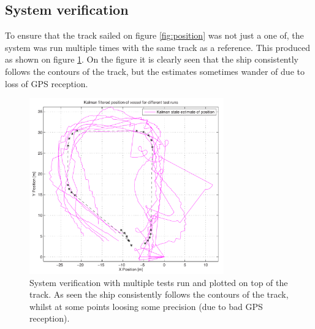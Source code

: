 \documentclass{ifacconf}
\begin{document}
\subsection{System verification}
To ensure that the track sailed on figure \ref{fig:position} was not just a one of, the system was run multiple times with the same track as a reference. This produced as shown on figure \ref{fig:position2}. On the figure it is clearly seen that the ship consistently follows the contours of the track, but the estimates sometimes wander of due to loss of GPS reception.
\begin{figure}
	\begin{center}
		\includegraphics[width=8.4cm]{img/position2}    %
		\caption{System verification with multiple tests run and plotted on top of the track. As seen the ship consistently follows the contours of the track, whilst at some points loosing some precision (due to bad GPS reception).}  %
		\label{fig:position2}               
	\end{center}                                 %
\end{figure}
\end{document}

